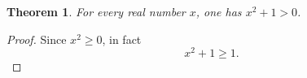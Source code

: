 \documentclass{article}
\newtheorem{theorem}{Theorem}
\begin{document}
\begin{theorem}\label{thm:scope-stronger-conclusion}
For every real number $x$, one has $x^2+1>0$.
\end{theorem}
\begin{proof}
Since $x^2\ge 0$, in fact
\[
  x^2+1\ge 1.
\]
\end{proof}
\end{document}
